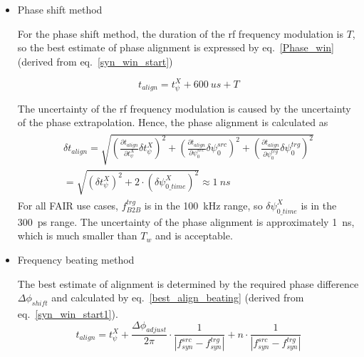 \begin{itemize}
\item Phase shift method

For the phase shift method, the duration of the rf frequency modulation is $T$, so the best estimate of phase alignment is expressed by  eq.~\ref{Phase_win} (derived from eq.~\ref{syn_win_start})

\begin{equation}
t_\mathit{align} = t_{\psi}^X + \SI{600}{us}+T \label{Phase_win}
\end{equation}

The uncertainty of the rf frequency modulation is caused by the uncertainty of the phase extrapolation. Hence, the phase alignment is calculated as
\begin{eqnarray}
\begin{aligned}
\delta t_\mathit{align} = \sqrt {(\frac {\partial t_\mathit{align}}{\partial t_\psi^\mathit{X}} \delta t_\psi^\mathit{X})^2 +(\frac {\partial t_\mathit{align}}{\partial \psi^\mathit{src}_0} \delta\psi^\mathit{src}_0)^2+(\frac {\partial t_\mathit{align}}{\partial \psi^\mathit{trg}_0} \delta\psi^\mathit{trg}_0)^2  }\\
=\sqrt {(\delta t_{\psi}^X)^2 + 2\cdot(\delta \psi^{X}_\mathit{0\_time})^2 }\approx \SI{1}{ns}
\end{aligned}
\end{eqnarray}
For all FAIR use cases, $f_\mathit{B2B}^\mathit{trg}$ is in the \SI{100}{kHz} range, so $\delta \psi^{X}_\mathit{0\_time}$ is in the \SI{300}{ps} range. The uncertainty of the phase alignment is approximately \SI{1}{ns}, which is much smaller than $T_\mathit{w}$ and is acceptable.

\item Frequency beating method

The best estimate of alignment is determined by the required phase difference $\Delta \phi_\mathit{shift}$ and calculated by eq.~\ref{best_align_beating} (derived from eq.~\ref{syn_win_start1}).
\begin{equation}
t_\mathit{align}= t_\psi^\mathit{X}+\frac{\Delta \phi_\mathit{adjust}}{2\pi}\cdot\frac{1}{|f_{\mathit{syn}}^\mathit{src}-f_{\mathit{syn}}^\mathit{trg}|}+ n\cdot \frac{1}{|f_{\mathit{syn}}^\mathit{src}-f_{\mathit{syn}}^\mathit{trg}|}
\label{best_align_beating}
\end{equation}


\end{itemize}
